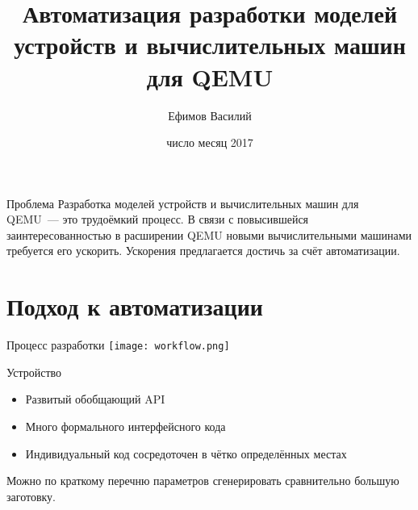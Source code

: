 \documentclass[unicode,hyperref={unicode=true}]{beamer}
\title[]
{Автоматизация разработки моделей устройств и вычислительных машин для QEMU}
\author[]{Ефимов Василий}
\institute[]{ИСП РАН}
\date[]{число месяц  2017}
\newcommand*{\sectionpagekb}{\usebeamertemplate*{section page kb}}
\theoremstyle{definition}
\theoremstyle{plain}
\begin{document}
\begin{frame}
\titlepage
\end{frame}



\begin{frame}{Проблема}
Разработка моделей устройств и вычислительных машин для QEMU~--- это трудоёмкий
процесс. В связи с повысившейся заинтересованностью в расширении QEMU новыми
вычислительными машинами требуется его ускорить. Ускорения предлагается достичь
за счёт автоматизации.
\end{frame}






\section{Подход к автоматизации}
\frame{\sectionpagekb}



\begin{frame}{Процесс разработки}
\texttt{[image: workflow.png]}
\end{frame}



\begin{frame}{Устройство}

\begin{itemize}
\item Развитый обобщающий API
\item Много формального интерфейсного кода
\item Индивидуальный код сосредоточен в чётко определённых местах
\end{itemize}

\begin{center}
Можно по краткому перечню параметров сгенерировать сравнительно большую
заготовку.
\end{center}

\end{frame}
\end{document}

